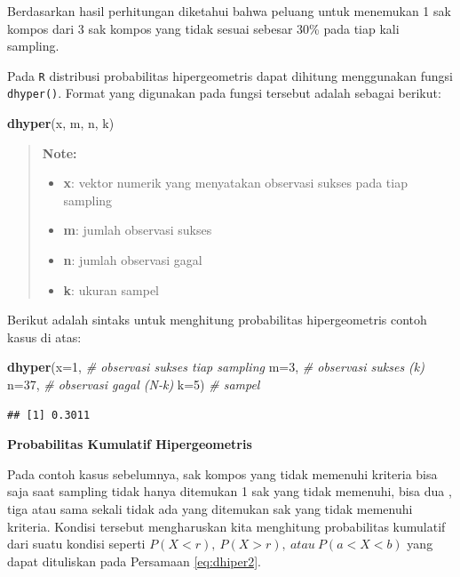 \documentclass[]{book}
\newenvironment{Shaded}{\begin{snugshade}}{\end{snugshade}}
\newcommand{\KeywordTok}[1]{\textcolor[rgb]{0.13,0.29,0.53}{\textbf{#1}}}
\newcommand{\DataTypeTok}[1]{\textcolor[rgb]{0.13,0.29,0.53}{#1}}
\newcommand{\DecValTok}[1]{\textcolor[rgb]{0.00,0.00,0.81}{#1}}
\newcommand{\CommentTok}[1]{\textcolor[rgb]{0.56,0.35,0.01}{\textit{#1}}}
\newcommand{\NormalTok}[1]{#1}
\providecommand{\tightlist}{%
  \setlength{\itemsep}{0pt}\setlength{\parskip}{0pt}}
\begin{document}
Berdasarkan hasil perhitungan diketahui bahwa peluang untuk menemukan 1
sak kompos dari 3 sak kompos yang tidak sesuai sebesar 30\% pada tiap
kali sampling.

Pada \texttt{R} distribusi probabilitas hipergeometris dapat dihitung
menggunakan fungsi \texttt{dhyper()}. Format yang digunakan pada fungsi
tersebut adalah sebagai berikut:

\begin{Shaded}
\begin{Highlighting}[]
\KeywordTok{dhyper}\NormalTok{(x, m, n, k)}
\end{Highlighting}
\end{Shaded}

\begin{quote}
\textbf{Note: }

\begin{itemize}
\tightlist
\item
  \textbf{x}: vektor numerik yang menyatakan observasi sukses pada tiap
  sampling
\item
  \textbf{m}: jumlah observasi sukses
\item
  \textbf{n}: jumlah observasi gagal
\item
  \textbf{k}: ukuran sampel
\end{itemize}
\end{quote}

Berikut adalah sintaks untuk menghitung probabilitas hipergeometris
contoh kasus di atas:

\begin{Shaded}
\begin{Highlighting}[]
\KeywordTok{dhyper}\NormalTok{(}\DataTypeTok{x=}\DecValTok{1}\NormalTok{, }\CommentTok{# observasi sukses tiap sampling}
       \DataTypeTok{m=}\DecValTok{3}\NormalTok{, }\CommentTok{# observasi sukses (k)}
       \DataTypeTok{n=}\DecValTok{37}\NormalTok{, }\CommentTok{# observasi gagal (N-k)}
       \DataTypeTok{k=}\DecValTok{5}\NormalTok{) }\CommentTok{# sampel}
\end{Highlighting}
\end{Shaded}

\begin{verbatim}
## [1] 0.3011
\end{verbatim}

\textbf{Probabilitas Kumulatif Hipergeometris}

Pada contoh kasus sebelumnya, sak kompos yang tidak memenuhi kriteria
bisa saja saat sampling tidak hanya ditemukan 1 sak yang tidak memenuhi,
bisa dua , tiga atau sama sekali tidak ada yang ditemukan sak yang tidak
memenuhi kriteria. Kondisi tersebut mengharuskan kita menghitung
probabilitas kumulatif dari suatu kondisi seperti
\(P\left(X<r\right),\ P\left(X>r\right),\ atau\ P\left(a<X<b\right)\)
yang dapat dituliskan pada Persamaan \eqref{eq:dhiper2}.
\end{document}
